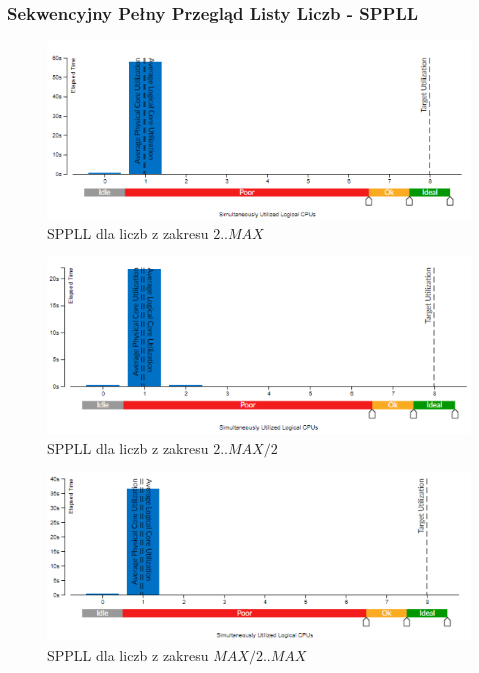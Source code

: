 \documentclass{article}
\begin{document}
            \subsubsection{Sekwencyjny Pełny Przegląd Listy Liczb - \gls{SPPLL}}
                \begin{figure}[H]
                    \includegraphics[width=13cm]{sekwencyjny_bezsita_2_MAX}
                    \caption{\gls{SPPLL} dla liczb z zakresu $2 .. MAX$}
                \end{figure}
                \begin{figure}[H]
                    \includegraphics[width=13cm]{sekwencyjny_bezsita_2_MAX2}
                    \caption{\gls{SPPLL} dla liczb z zakresu $2 .. MAX / 2$}
                \end{figure}
                \begin{figure}[H]
                    \includegraphics[width=13cm]{sekwencyjny_bezsita_MAX2_MAX}
                    \caption{\gls{SPPLL} dla liczb z zakresu $MAX / 2 .. MAX$}
                \end{figure}
            
\end{document}
